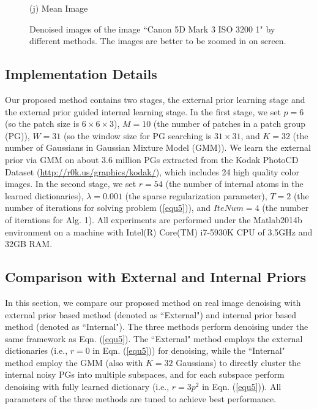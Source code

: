 \documentclass[10pt,twocolumn,letterpaper]{article}
\begin{document}
\begin{figure}
{\begin{minipage}[t]{0.195\textwidth}
{\footnotesize (j) Mean Image \cite{crosschannel2016}}
\end{minipage}
}\vspace{-1mm}
\caption{Denoised images of the image ``Canon 5D Mark 3 ISO 3200 1" by different methods. The images are better to be zoomed in on screen.}
\vspace{-1mm}
\label{fig5}
\end{figure}

\subsection{Implementation Details}
Our proposed method contains two stages, the external prior learning stage and the external prior guided internal learning stage. In the first stage, we set $p = 6$ (so the patch size is $6\times 6 \times 3$), $M=10$ (the number of patches in a patch group (PG)), $W=31$ (so the window size for PG searching is $31\times31$, and $K=32$ (the number of Gaussians in Gaussian Mixture Model (GMM)). We learn the external prior via GMM on about 3.6 million PGs extracted from the Kodak PhotoCD Dataset (\url{http://r0k.us/graphics/kodak/}), which includes 24 high quality color images. In the second stage, we set $r=54$ (the number of internal atoms in the learned dictionaries), $\lambda=0.001$ (the sparse regularization parameter), $T=2$ (the number of iterations for solving problem (\ref{equ5})), and $IteNum=4$ (the number of iterations for Alg. 1). All experiments are performed under the Matlab2014b environment on a machine with Intel(R) Core(TM) i7-5930K CPU of 3.5GHz and 32GB RAM.

\subsection{Comparison with External and Internal Priors}
In this section, we compare our proposed method on real image denoising with external prior based method (denoted as ``External") and internal prior based method (denoted as ``Internal"). The three methods perform denoising under the same framework as Eqn. (\ref{equ5}). The ``External" method employs the external dictionaries (i.e., $r=0$ in Eqn. (\ref{equ5})) for denoising, while the ``Internal" method employ the GMM (also with $K=32$ Gaussians) to directly cluster the internal noisy PGs into multiple subspaces, and for each subspace perform denoising with fully learned dictionary (i.e., $r=3p^{2}$ in Eqn. (\ref{equ5})). All parameters of the three methods are tuned to achieve best performance.
\end{document}
